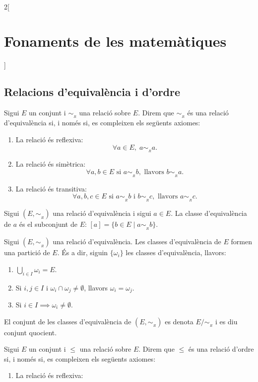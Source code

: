 \documentclass[class=article,10pt,crop=false]{standalone}
\begin{document}
\begin{multicols}{2}[\section{Fonaments de les matemàtiques}]
\subsection{Relacions d'equivalència i d'ordre}
\begin{definition}
Sigui $E$ un conjunt i $\sim_{\!_R}$ una relació sobre $E$. Direm que $\sim_{\!_R}$ és una relació d'equivalència si, i només si, es compleixen els següents axiomes:
\begin{enumerate}
    \item La relació és reflexiva:
    $$\forall a\in E,\;a\sim_{\!_R} a.$$
    \item La relació és simètrica:
    $$\forall a,b\in E\text{ si }a\sim_{\!_R} b,\text{ llavors }b\sim_{\!_R} a.$$
    \item La relació és transitiva:
    $$\forall a,b,c\in E\text{ si }a\sim_{\!_R} b\text{ i }b\sim_{\!_R} c,\text{ llavors }a\sim_{\!_R} c.$$
\end{enumerate}
\end{definition}
\begin{definition}
Sigui $(E,\sim_{\!_R})$ una relació d'equivalència i sigui $a\in E$. La classe d'equivalència de $a$ és el subconjunt de $E$: $[a]=\{b\in E\mid a\sim_{\!_R} b\}$.
\end{definition}
\begin{theorem}
Sigui $(E,\sim_{\!_R})$ una relació d'equivalència. Les classes d'equivalència de $E$ formen una partició de $E$. És a dir, siguin $\{\omega_i\}$ les classes d'equivalència, llavors:
\begin{enumerate}
    \item $\bigcup_{i\in I} \omega_i=E$.
    \item Si $i,j\in I$ i $\omega_i\cap\omega_j\ne\emptyset$, llavors $\omega_i=\omega_j$.
    \item Si $i\in I\implies\omega_i\ne\emptyset$.
\end{enumerate}
\end{theorem}
\begin{definition}
El conjunt de les classes d'equivalència de $(E,\sim_{\!_R})$ es denota $E/\sim_{\!_R}$ i es diu conjunt quocient.
\end{definition}
\begin{definition}
Sigui $E$ un conjunt i $\leq$ una relació sobre $E$. Direm que $\leq$ és una relació d'ordre si, i només si, es compleixen els següents axiomes:
\begin{enumerate}
    \item La relació és reflexiva:

\end{enumerate}
\end{definition}
\end{multicols}
\end{document}

